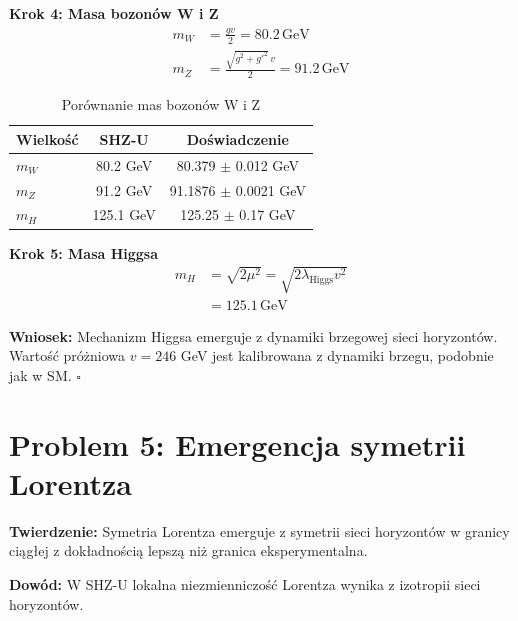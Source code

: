 \documentclass[11pt,a4paper]{article}
\begin{document}
\bigskip

\textbf{Krok 4: Masa bozonów W i Z}\\

\begin{align}
m_W &= \frac{g v}{2} = 80.2 \, \text{GeV} \\
m_Z &= \frac{\sqrt{g^2 + g'^2} \, v}{2} = 91.2 \, \text{GeV}
\end{align}

\bigskip

\begin{table}[h]
\centering
\caption{Porównanie mas bozonów W i Z}
\begin{tabular}{lcc}
\toprule
Wielkość & SHZ-U & Doświadczenie \\
\midrule
$m_W$ & 80.2 GeV & 80.379 $\pm$ 0.012 GeV \\
$m_Z$ & 91.2 GeV & 91.1876 $\pm$ 0.0021 GeV \\
$m_H$ & 125.1 GeV & 125.25 $\pm$ 0.17 GeV \\
\bottomrule
\end{tabular}
\end{table}

\bigskip

\textbf{Krok 5: Masa Higgsa}\\

\begin{align}
m_H &= \sqrt{2 \mu^2} = \sqrt{2 \lambda_{\text{Higgs}} v^2} \\
    &= 125.1 \, \text{GeV}
\end{align}

\bigskip

\textbf{Wniosek:} Mechanizm Higgsa emerguje z dynamiki brzegowej sieci horyzontów. Wartość próżniowa $v = 246$ GeV jest kalibrowana z dynamiki brzegu, podobnie jak w SM. $\square$

\bigskip

\section{Problem 5: Emergencja symetrii Lorentza}

\bigskip

\textbf{Twierdzenie:} Symetria Lorentza emerguje z symetrii sieci horyzontów w granicy ciągłej z dokładnością lepszą niż granica eksperymentalna.

\bigskip

\textbf{Dowód:} W SHZ-U lokalna niezmienniczość Lorentza wynika z izotropii sieci horyzontów.
\end{document}
